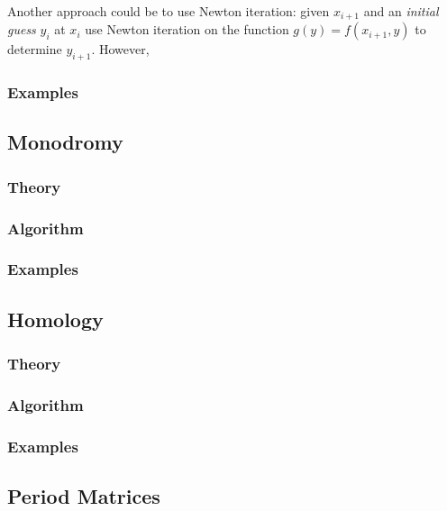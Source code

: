 Another approach could be to use Newton iteration: given $x_{i+1}$ and
an {\it initial guess} $y_i$ at $x_i$ use Newton iteration on the
function $g(y) = f(x_{i+1}, y)$ to determine $y_{i+1}$. However, 

%
\subsubsection*{Examples}
%

\subsection{Monodromy} \label{sec: monodromy}

%
\subsubsection*{Theory}
%
%
\subsubsection*{Algorithm}
%
%
\subsubsection*{Examples}
%

\subsection{Homology}

%
\subsubsection*{Theory}
%
%
\subsubsection*{Algorithm}
%
%
\subsubsection*{Examples}
%

\subsection{Period Matrices}

